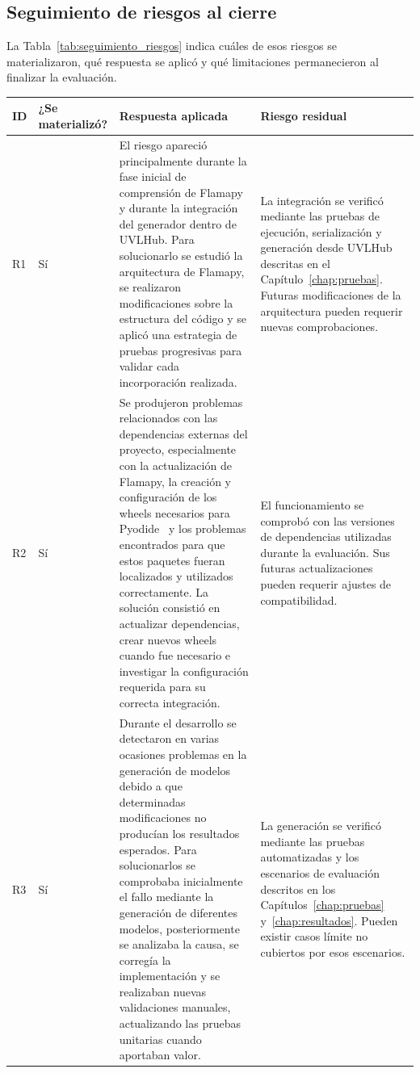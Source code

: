 \subsection{Seguimiento de riesgos al cierre}
\label{sec:seguimiento_riesgos}

La Tabla~\ref{tab:seguimiento_riesgos} indica cuáles de esos riesgos
se materializaron, qué respuesta se aplicó y qué limitaciones
permanecieron al finalizar la evaluación.

\begin{longtable}{@{}P{0.7cm} P{2.8cm} P{5.4cm} P{5.3cm}@{}}
  \toprule
  \textbf{ID} & \textbf{¿Se materializó?} & \textbf{Respuesta aplicada} & \textbf{Riesgo residual} \\
  \midrule
  \endhead

  R1 &
  Sí &
  El riesgo apareció principalmente durante la fase inicial de comprensión de Flamapy y durante la integración del generador dentro de UVLHub. Para solucionarlo se estudió la arquitectura de Flamapy, se realizaron modificaciones sobre la estructura del código y se aplicó una estrategia de pruebas progresivas para validar cada incorporación realizada. &
  La integración se verificó mediante las pruebas de ejecución,
  serialización y generación desde UVLHub descritas en el
  Capítulo~\ref{chap:pruebas}. Futuras modificaciones de la arquitectura
  pueden requerir nuevas comprobaciones. \\[0.3em]

  R2 &
  Sí &
  Se produjeron problemas relacionados con las dependencias externas del proyecto, especialmente con la actualización de Flamapy, la creación y configuración de los wheels necesarios para Pyodide~\cite{pyodide} y los problemas encontrados para que estos paquetes fueran localizados y utilizados correctamente. La solución consistió en actualizar dependencias, crear nuevos wheels cuando fue necesario e investigar la configuración requerida para su correcta integración. &
  El funcionamiento se comprobó con las versiones de dependencias
  utilizadas durante la evaluación. Sus futuras actualizaciones pueden
  requerir ajustes de compatibilidad. \\[0.3em]

  R3 &
  Sí &
  Durante el desarrollo se detectaron en varias ocasiones problemas en la generación de modelos debido a que determinadas modificaciones no producían los resultados esperados. Para solucionarlos se comprobaba inicialmente el fallo mediante la generación de diferentes modelos, posteriormente se analizaba la causa, se corregía la implementación y se realizaban nuevas validaciones manuales, actualizando las pruebas unitarias cuando aportaban valor. &
  La generación se verificó mediante las pruebas automatizadas y los
  escenarios de evaluación descritos en los
  Capítulos~\ref{chap:pruebas} y~\ref{chap:resultados}. Pueden existir
  casos límite no cubiertos por esos escenarios. \\[0.3em]


\end{longtable}
